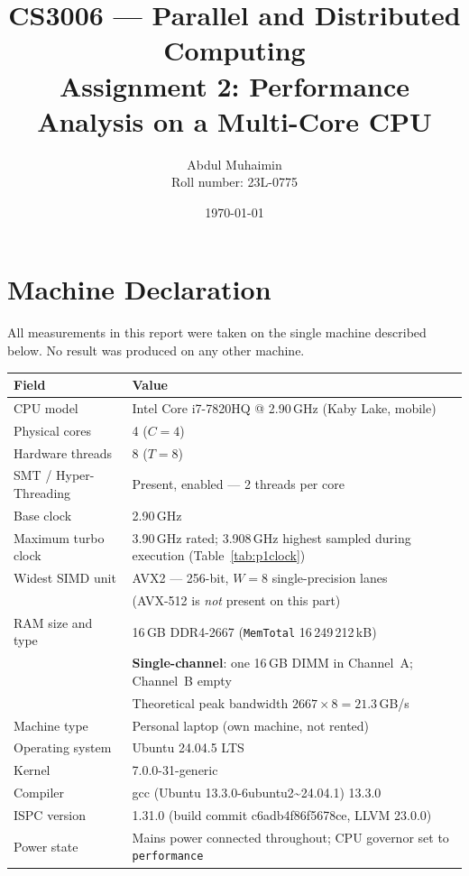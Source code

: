 \documentclass[11pt,a4paper]{article}
\title{\vspace{-1.5cm}\textbf{CS3006 --- Parallel and Distributed Computing}\\[0.3em]
       \large Assignment 2: Performance Analysis on a Multi-Core CPU}
\author{Abdul Muhaimin \\ Roll number: 23L-0775}
\date{\today}
\begin{document}
\maketitle

\section{Machine Declaration}

All measurements in this report were taken on the single machine described
below. No result was produced on any other machine.

\begin{table}[H]
\centering
\begin{tabular}{l p{10.3cm}}
\toprule
\textbf{Field} & \textbf{Value} \\
\midrule
CPU model                 & Intel Core i7-7820HQ @ 2.90\,GHz (Kaby Lake, mobile) \\
Physical cores            & 4 \quad ($C = 4$) \\
Hardware threads          & 8 \quad ($T = 8$) \\
SMT / Hyper-Threading     & Present, enabled --- 2 threads per core \\
Base clock                & 2.90\,GHz \\
Maximum turbo clock       & 3.90\,GHz rated; 3.908\,GHz highest sampled during execution (Table~\ref{tab:p1clock}) \\
Widest SIMD unit          & AVX2 --- 256-bit, $W = 8$ single-precision lanes \\
                          & (AVX-512 is \emph{not} present on this part) \\
RAM size and type         & 16\,GB DDR4-2667 (\texttt{MemTotal} 16\,249\,212\,kB) \\
                          & \textbf{Single-channel}: one 16\,GB DIMM in Channel~A;
                            Channel~B empty \\
                          & Theoretical peak bandwidth
                            $2667 \times 8 = 21.3$\,GB/s \\
Machine type              & Personal laptop (own machine, not rented) \\
Operating system          & Ubuntu 24.04.5 LTS \\
Kernel                    & 7.0.0-31-generic \\
Compiler                  & gcc (Ubuntu 13.3.0-6ubuntu2\textasciitilde24.04.1) 13.3.0 \\
ISPC version              & 1.31.0 (build commit c6adb4f86f5678ce, LLVM 23.0.0) \\
Power state               & Mains power connected throughout; CPU governor set to \texttt{performance} \\
\bottomrule
\end{tabular}
\end{table}
\end{document}
